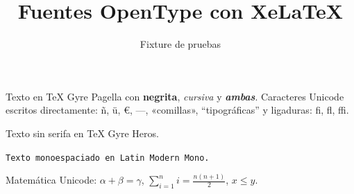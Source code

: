 \documentclass[11pt,a4paper]{article}
\title{Fuentes OpenType con XeLaTeX}
\author{Fixture de pruebas}
\date{}
\begin{document}
\maketitle

Texto en TeX Gyre Pagella con \textbf{negrita}, \textit{cursiva} y
\textbf{\textit{ambas}}. Caracteres Unicode escritos directamente: ñ, ü, €, —,
«comillas», “tipográficas” y ligaduras: fi, fl, ffi.

\textsf{Texto sin serifa en TeX Gyre Heros.}

\texttt{Texto monoespaciado en Latin Modern Mono.}

Matemática Unicode: $α + β = γ$, $∑_{i=1}^{n} i = \frac{n(n+1)}{2}$, $x ≤ y$.
\end{document}

